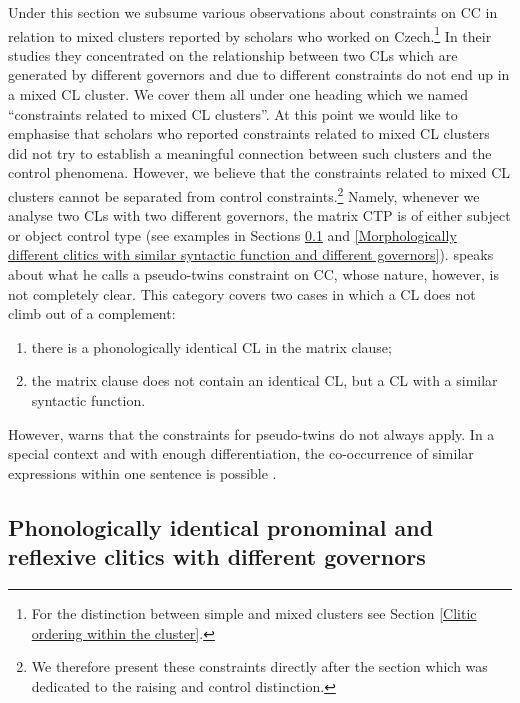 Under this section we subsume various observations about constraints on CC in relation to mixed clusters reported by scholars who worked on Czech.\footnote{For the distinction between simple and mixed clusters see Section \ref{Clitic ordering within the cluster}.} In their studies they concentrated on the relationship between two CLs which are generated by different governors and due to different constraints do not end up in a mixed CL cluster. We cover them all under one heading which we named “constraints related to mixed CL clusters”. At this point we would like to emphasise that scholars who reported constraints related to mixed CL clusters did not try to establish a meaningful connection between such clusters and the control phenomena. However, we believe that the constraints related to mixed CL clusters cannot be separated from control constraints.\footnote{We therefore present these constraints directly after the section which was dedicated to the raising and control distinction.} Namely, whenever we analyse two CLs with two different governors, the matrix CTP is of either subject or object control type (see examples in Sections \ref{Phonologically identical pronominal and reflexive clitics with different governors} and \ref{Morphologically different clitics with similar syntactic function and different governors}). \citet[79]{Junghanns02} speaks about what he calls a pseudo-twins constraint on CC, whose nature, however, is not completely clear. This category covers two cases in which a CL does not climb out of a complement:

\begin{enumerate}
\item there is a phonologically identical CL in the matrix clause;
\item the matrix clause does not contain an identical CL, but a CL with a similar syntactic function.
\end{enumerate}

However, \citet[80]{Junghanns02} warns that the constraints for pseudo-twins do not always apply. In a special context and with enough differentiation, the co-occurrence of similar expressions within one sentence is possible \citep[see][]{Lenertova04}.

\subsection{Phonologically identical pronominal and reflexive clitics with different governors}
\label{Phonologically identical pronominal and reflexive clitics with different governors}

